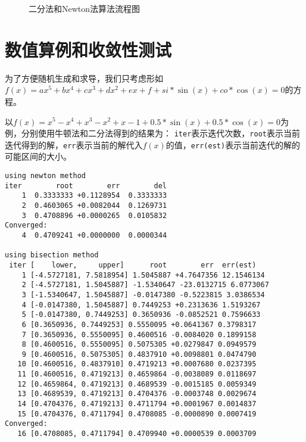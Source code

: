 \documentclass{article}
\begin{document}
\begin{figure}[H]
 \caption{二分法和Newton法算法流程图}
 \label{algo::1}
\end{figure}
\section{数值算例和收敛性测试}
     为了方便随机生成和求导，我们只考虑形如$f(x)=ax^5+bx^4+cx^3+dx^2+ex+f+si*\sin(x)+co*\cos(x)=0$的方程。
     
     以$f(x)=x^5-x^4+x^3-x^2+x-1+0.5*\sin(x)+0.5*\cos(x)=0$为例，分别使用牛顿法和二分法得到的结果为：
     \verb|iter|表示迭代次数，\verb|root|表示当前迭代得到的解，\verb|err|表示当前的解代入$f(x)$的值，\verb|err(est)|表示当前迭代的解的可能区间的大小。
     \begin{verbatim}
using newton method
iter        root        err        del
    1  0.3333333 +0.1128954  0.3333333
    2  0.4603065 +0.0082044  0.1269731
    3  0.4708896 +0.0000265  0.0105832
Converged:
    4  0.4709241 +0.0000000  0.0000344

using bisection method
 iter [    lower,     upper]      root        err  err(est)
    1 [-4.5727181, 7.5818954] 1.5045887 +4.7647356 12.1546134
    2 [-4.5727181, 1.5045887] -1.5340647 -23.0132715 6.0773067
    3 [-1.5340647, 1.5045887] -0.0147380 -0.5223815 3.0386534
    4 [-0.0147380, 1.5045887] 0.7449253 +0.2313636 1.5193267
    5 [-0.0147380, 0.7449253] 0.3650936 -0.0852521 0.7596633
    6 [0.3650936, 0.7449253] 0.5550095 +0.0641367 0.3798317
    7 [0.3650936, 0.5550095] 0.4600516 -0.0084020 0.1899158
    8 [0.4600516, 0.5550095] 0.5075305 +0.0279847 0.0949579
    9 [0.4600516, 0.5075305] 0.4837910 +0.0098801 0.0474790
   10 [0.4600516, 0.4837910] 0.4719213 +0.0007680 0.0237395
   11 [0.4600516, 0.4719213] 0.4659864 -0.0038089 0.0118697
   12 [0.4659864, 0.4719213] 0.4689539 -0.0015185 0.0059349
   13 [0.4689539, 0.4719213] 0.4704376 -0.0003748 0.0029674
   14 [0.4704376, 0.4719213] 0.4711794 +0.0001967 0.0014837
   15 [0.4704376, 0.4711794] 0.4708085 -0.0000890 0.0007419
Converged:
   16 [0.4708085, 0.4711794] 0.4709940 +0.0000539 0.0003709
     \end{verbatim}
\end{document}
